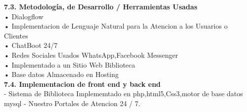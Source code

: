 \begin{flushleft}
\begin{itemize}
\textbf{7.3.   Metodología, de Desarrollo / Herramientas Usadas}\\
•	 Dialogflow \\
•	 Implementacion de Lenguaje Natural para la Atencion a los Usuarios o Clientes\\
•	 ChatBoot 24/7 \\
•	 Redes Sociales Usados  WhatsApp,Facebook Messenger \\
•	Implementado a un Sitio Web  Biblioteca \\
•	 Base datos Almacenado en Hosting \\


\textbf{7.4.   Implementacion de front end y back end  }\\
-	 Sistema de Biblioteca Implememtado en php,html5,Css3,motor de base datos mysql
-          Nuestro  Portales de Atencion 24 / 7.


\end{itemize}
\end{flushleft}
